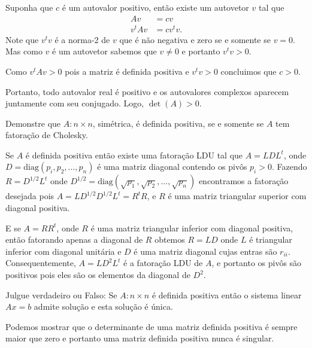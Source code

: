 \begin{questions}
\begin{solution}
        Suponha que $c$ \'{e} um autovalor positivo, ent\~{a}o existe um autovetor $v$ tal que
        \begin{align*}
            A v &= c v \\
            v^t A v &= c v^t v.
        \end{align*}
        Note que $v^t v$ \'{e} a norma-2 de $v$ que \'{e} n\~{a}o negativa e zero se e somente se $v = 0$. Mas como $v$ \'{e} um autovetor sabemos que $v \neq 0$ e portanto $v^t v > 0$.

        Como $v^t A v > 0$ pois a matriz \'{e} definida positiva e $v^t v > 0$ concluimos que $c > 0$.

        Portanto, todo autovalor real \'{e} positivo e os autovalores complexos aparecem juntamente com seu conjugado. Logo, $\det(A) > 0$.
    \end{solution}

     Demonstre que $A : n \times n$, sim\'{e}trica, \'{e} definida positiva, se e somente se $A$ tem fatora\c{c}\~{a}o de Cholesky.
    \begin{solution}
        Se $A$ \'{e} definida positiva ent\~{a}o existe uma fatora\c{c}\~{a}o LDU tal que $A = L D L^t$, onde $D = \text{diag}(p_i, p_2, \ldots, p_n)$ \'{e} uma matriz diagonal contendo os pivôs $p_i > 0$. Fazendo $R = D^{1/2} L^t$ onde $D^{1/2} = \text{diag}(\sqrt{p_1}, \sqrt{p_2}, \ldots, \sqrt{p_n})$ encontramos a fatora\c{c}\~{a}o desejada pois $A = L D^{1/2} D^{1/2} L^t = R^t R$, e $R$ \'{e} uma matriz triangular superior com diagonal positiva.
        
        E se $A = R R^t$, onde $R$ \'{e} uma matriz triangular inferior com diagonal positiva, ent\~{a}o fatorando apenas a diagonal de $R$ obtemos $R = L D$ onde $L$ \'{e} triangular inferior com diagonal unit\'{a}ria e $D$ \'{e} uma matriz diagonal cujas entras s\~{a}o $r_{ii}$. Consequentemente, $A = L D^2 L^t$ \'{e} a fatora\c{c}\~{a}o LDU de $A$, e portanto os pivôs s\~{a}o positivos pois eles s\~{a}o os elementos da diagonal de $D^2$.
    \end{solution}

    \question Julgue verdadeiro ou Falso: Se $A : n \times n$ \'{e} definida positiva ent\~{a}o o sistema linear $A x = b$ admite solu\c{c}\~{a}o e esta solu\c{c}\~{a}o \'{e} \'{u}nica.
    \begin{solution}
        Podemos mostrar que o determinante de uma matriz definida positiva \'{e} sempre maior que zero e portanto uma matriz definida positiva nunca \'{e} singular.


\end{solution}
\end{questions}
